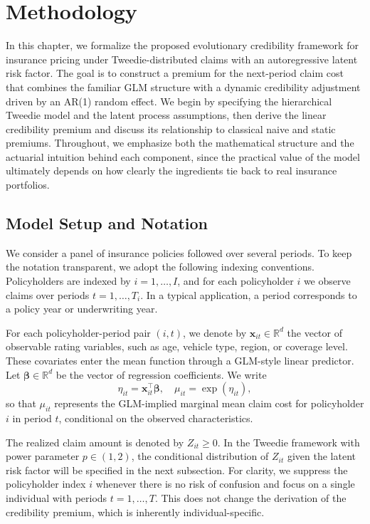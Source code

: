 \documentclass{sfuthesis}
\numberwithin{equation}{chapter}
\begin{document}
\chapter{Methodology}
\label{sec:methodology}
In this chapter, we formalize the proposed evolutionary credibility framework
for insurance pricing under Tweedie-distributed claims with an autoregressive
latent risk factor. The goal is to construct a premium for the next-period claim
cost that combines the familiar GLM structure with
a dynamic credibility adjustment driven by an AR(1) random effect.
We begin by specifying the hierarchical Tweedie model and the latent process
assumptions, then derive the linear credibility premium and discuss its
relationship to classical naive and static premiums. Throughout, we emphasize
both the mathematical structure and the actuarial intuition behind each
component, since the practical value of the model ultimately depends on how
clearly the ingredients tie back to real insurance portfolios. 

\section{Model Setup and Notation}
\label{subsec:setup}

We consider a panel of insurance policies followed over several periods.
To keep the notation transparent, we adopt the following indexing conventions.
Policyholders are indexed by \(i = 1, \ldots, I\), and for each policyholder
\(i\) we observe claims over periods \(t = 1, \ldots, T_i\). In a typical
application, a period corresponds to a policy year or underwriting year. 

For each policyholder-period pair \((i,t)\), we denote by
\(\mathbf{x}_{it} \in \mathbb{R}^d\) the vector of observable rating variables,
such as age, vehicle type, region, or coverage level. These covariates enter
the mean function through a GLM-style linear predictor. Let
\(\boldsymbol{\beta} \in \mathbb{R}^d\) be the vector of regression coefficients.
We write
\[
\eta_{it} = \mathbf{x}_{it}^\top \boldsymbol{\beta},
\quad
\mu_{it} = \exp(\eta_{it}),
\]
so that \(\mu_{it}\) represents the GLM-implied marginal mean claim cost for
policyholder \(i\) in period \(t\), conditional on the observed characteristics. 

The realized claim amount is denoted by \(Z_{it} \ge 0\). In the Tweedie
framework with power parameter \(p \in (1,2)\), the conditional distribution
of \(Z_{it}\) given the latent risk factor will be specified in the next
subsection. For clarity, we suppress the policyholder index \(i\) whenever
there is no risk of confusion and focus on a single individual with periods
\(t = 1, \ldots, T\). This does not change the derivation of the credibility
premium, which is inherently individual-specific. 
\end{document}
